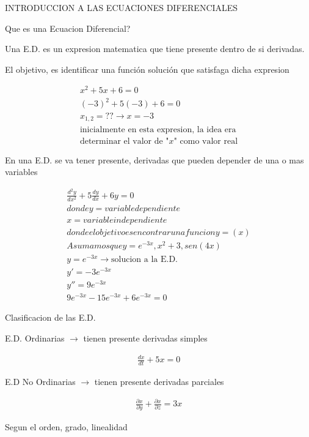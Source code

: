 \documentclass{article}
\begin{document}
INTRODUCCION A LAS ECUACIONES DIFERENCIALES



Que es una Ecuacion Diferencial?

Una E.D. es un expresion matematica que tiene presente dentro de si derivadas.

El objetivo, es identificar una función solución que satisfaga dicha expresion


\begin{gather*}
x^{2}+5x+6=0 \\
(-3)^{2}+5(-3)+6=0 \\
x_{1,2} = ??   \rightarrow  x=-3 \\
\text{inicialmente en esta expresion, la idea era} \\
\text{determinar el valor de "}x\text{" como valor real}
\end{gather*}


En una E.D. se va tener presente, derivadas que pueden depender de una o mas variables


\begin{gather*}
\frac{d^{2}y}{dx^{2}}+5\frac{dy}{dx}+6y=0 \\
donde y = variable dependiente \\
x = variable independiente \\
donde el objetivo es encontrar una funcion y=(x) \\
Asumamos que   y = e^{-3x} ,  x^{2}+3  , sen(4x) \\
                                 y =  e^{-3x}  \rightarrow \text{solucion a la E.D.} \\
y' = -3e^{-3x} \\
y'' = 9e^{-3x} \\
9e^{-3x}-15e^{-3x}+6e^{-3x}=0
\end{gather*}


Clasificacion de las E.D.

E.D. Ordinarias $\rightarrow$  tienen presente derivadas simples


\begin{gather*}
\frac{dx}{dt} +5x =0 
\end{gather*}


E.D No Ordinarias $\rightarrow$  tienen presente derivadas parciales


\begin{gather*}
\frac{\partial x}{\partial y} + \frac{\partial x}{\partial z}=3x
\end{gather*}


Segun el orden, grado, linealidad
\end{document}
